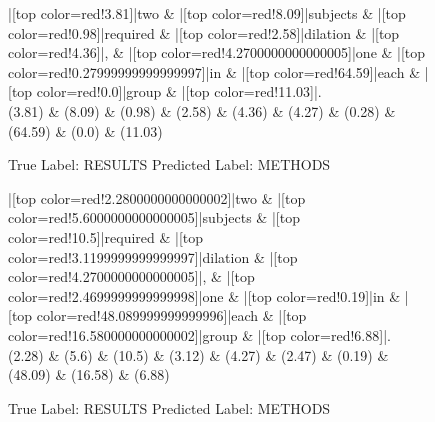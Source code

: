 \documentclass[a4paper, landscape]{article}
\begin{document}
\begin{figure}
\begin{center}
\begin{dependency}
\begin{deptext}
|[top color=red!3.81]|two \& |[top color=red!8.09]|subjects \& |[top color=red!0.98]|required \& |[top color=red!2.58]|dilation \& |[top color=red!4.36]|, \& |[top color=red!4.2700000000000005]|one \& |[top color=red!0.27999999999999997]|in \& |[top color=red!64.59]|each \& |[top color=red!0.0]|group \& |[top color=red!11.03]|.\\
(3.81) \& (8.09) \& (0.98) \& (2.58) \& (4.36) \& (4.27) \& (0.28) \& (64.59) \& (0.0) \& (11.03)\\
\end{deptext}
\end{dependency}
\end{center}
\caption{True Label: RESULTS Predicted Label: METHODS}
\end{figure}
\clearpage
\begin{figure}
\begin{center}
\begin{dependency}
\begin{deptext}
|[top color=red!2.2800000000000002]|two \& |[top color=red!5.6000000000000005]|subjects \& |[top color=red!10.5]|required \& |[top color=red!3.1199999999999997]|dilation \& |[top color=red!4.2700000000000005]|, \& |[top color=red!2.4699999999999998]|one \& |[top color=red!0.19]|in \& |[top color=red!48.089999999999996]|each \& |[top color=red!16.580000000000002]|group \& |[top color=red!6.88]|.\\
(2.28) \& (5.6) \& (10.5) \& (3.12) \& (4.27) \& (2.47) \& (0.19) \& (48.09) \& (16.58) \& (6.88)\\
\end{deptext}
\end{dependency}
\end{center}
\caption{True Label: RESULTS Predicted Label: METHODS}
\end{figure}
\end{document}
